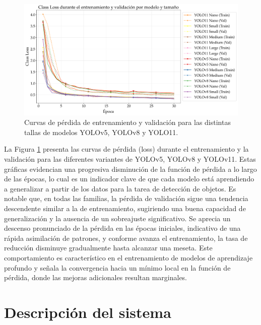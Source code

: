 \documentclass[11pt,spanish,listoffigures,listoftables]{tfgetsinf}
\begin{document}
\begin{figure}[H]
   \centering
   \includegraphics[width=\linewidth]{excels/entrenamiento/loss_plot.pdf}
   \caption[Curvas de pérdida de entrenamiento y validación para las distintas tallas de modelos YOLOv5, YOLOv8 y YOLO11]{Curvas de pérdida de entrenamiento y validación para las distintas tallas de modelos YOLOv5, YOLOv8 y YOLO11.}
   \label{fig:loss_curves}
\end{figure}

La Figura \ref{fig:loss_curves} presenta las curvas de pérdida (loss) durante el entrenamiento y la validación para las diferentes variantes de YOLOv5, YOLOv8 y YOLOv11. Estas gráficas evidencian una progresiva disminución de la función de pérdida a lo largo de las épocas, lo cual es un indicador clave de que cada modelo está aprendiendo a generalizar a partir de los datos para la tarea de detección de objetos. Es notable que, en todas las familias, la pérdida de validación sigue una tendencia descendente similar a la de entrenamiento, sugiriendo una buena capacidad de generalización y la ausencia de un sobreajuste significativo. Se aprecia un descenso pronunciado de la pérdida en las épocas iniciales, indicativo de una rápida asimilación de patrones, y conforme avanza el entrenamiento, la tasa de reducción disminuye gradualmente hasta alcanzar una meseta. Este comportamiento es característico en el entrenamiento de modelos de aprendizaje profundo y señala la convergencia hacia un mínimo local en la función de pérdida, donde las mejoras adicionales resultan marginales.



\section{Descripción del sistema} \label{sec:descripcion_sistema}
\end{document}
